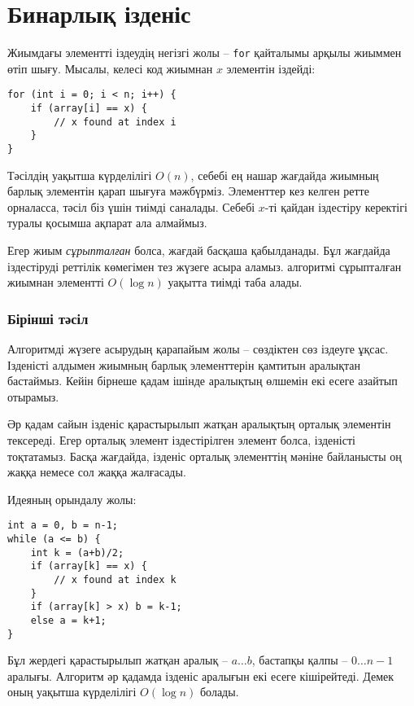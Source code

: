 \section{Бинарлық ізденіс}


Жиымдағы элементті іздеудің негізгі жолы -- \texttt{for} 
қайталымы арқылы жиыммен өтіп шығу.
Мысалы, келесі код жиымнан
$x$ элементін іздейді:

\begin{lstlisting}
for (int i = 0; i < n; i++) {
    if (array[i] == x) {
        // x found at index i
    }
}
\end{lstlisting}

Тәсілдің уақытша күрделілігі $O(n)$, себебі ең нашар жағдайда
жиымның барлық элементін қарап шығуға мәжбүрміз.
Элементтер кез келген ретте орналасса, тәсіл біз үшін тиімді саналады.
Себебі $x$-ті қайдан іздестіру керектігі туралы қосымша ақпарат ала алмаймыз.

Егер жиым \emph{сұрыпталған} болса, жағдай басқаша қабылданады.
Бұл жағдайда іздестіруді реттілік көмегімен 
тез жүзеге асыра аламыз.
 алгоритмі сұрыпталған жиымнан
элементті $O(\log n)$ уақытта тиімді таба алады.

\subsubsection{Бірінші тәсіл}

Алгоритмді жүзеге асырудың қарапайым жолы -- сөздіктен 
сөз іздеуге ұқсас. Ізденісті алдымен жиымның барлық 
элементтерін қамтитын аралықтан бастаймыз.
Кейін бірнеше қадам ішінде аралықтың өлшемін 
екі есеге азайтып отырамыз.

Әр қадам сайын ізденіс қарастырылып жатқан
аралықтың орталық элементін тексереді.
Егер орталық элемент іздестірілген элемент болса,
ізденісті тоқтатамыз.
Басқа жағдайда, ізденіс орталық элементтің мәніне байланысты
оң жаққа немесе сол жаққа жалғасады.

Идеяның орындалу жолы:
\begin{lstlisting}
int a = 0, b = n-1;
while (a <= b) {
    int k = (a+b)/2;
    if (array[k] == x) {
        // x found at index k
    }
    if (array[k] > x) b = k-1;
    else a = k+1;
}
\end{lstlisting}

Бұл жердегі қарастырылып жатқан аралық -- $a \ldots b$,
бастапқы қалпы -- $0 \ldots n-1$ аралығы.
Алгоритм әр қадамда ізденіс аралығын екі есеге кішірейтеді. Демек оның уақытша күрделілігі $O(\log n)$ болады. 

